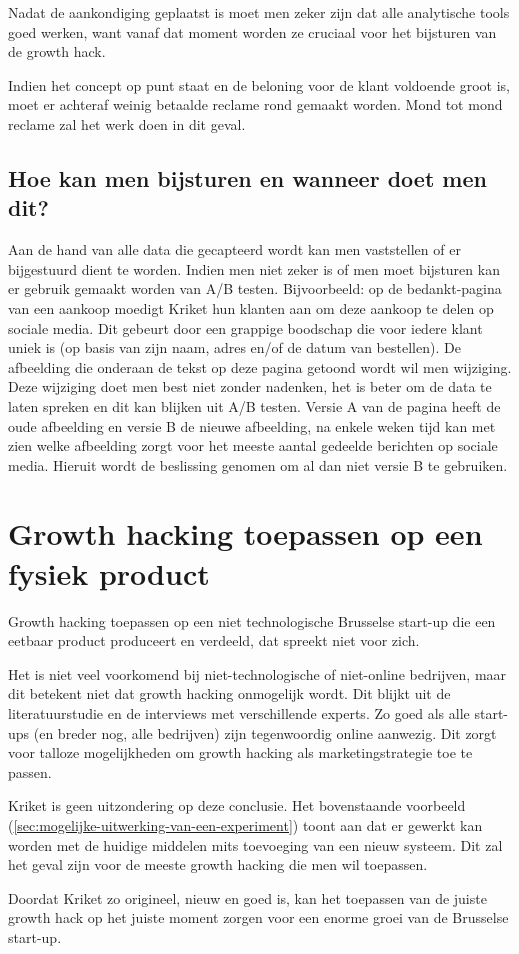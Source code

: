 Nadat de aankondiging geplaatst is moet men zeker zijn dat alle analytische tools goed werken, want vanaf dat moment worden ze cruciaal voor het bijsturen van de growth hack.

Indien het concept op punt staat en de beloning voor de klant voldoende groot is, moet er achteraf weinig betaalde reclame rond gemaakt worden. Mond tot mond reclame zal het werk doen in dit geval. 

\subsection{Hoe kan men bijsturen en wanneer doet men dit?}
\label{subsec:growth-hack-bijsturen}
Aan de hand van alle data die gecapteerd wordt kan men vaststellen of er bijgestuurd dient te worden. Indien men niet zeker is of men moet bijsturen kan er gebruik gemaakt worden van A/B testen. Bijvoorbeeld: op de bedankt-pagina van een aankoop moedigt Kriket hun klanten aan om deze aankoop te delen op sociale media. Dit gebeurt door een grappige boodschap die voor iedere klant uniek is (op basis van zijn naam, adres en/of de datum van bestellen). De afbeelding die onderaan de tekst op deze pagina getoond wordt wil men wijziging. Deze wijziging doet men best niet zonder nadenken, het is beter om de data te laten spreken en dit kan blijken uit A/B testen. Versie A van de pagina heeft de oude afbeelding en versie B de nieuwe afbeelding, na enkele weken tijd kan met zien welke afbeelding zorgt voor het meeste aantal gedeelde berichten op sociale media. Hieruit wordt de beslissing genomen om al dan niet versie B te gebruiken.
 
\section{Growth hacking toepassen op een fysiek product}
\label{sec:growth-hacking-mogelijk}
Growth hacking toepassen op een niet technologische Brusselse start-up die een eetbaar product produceert en verdeeld, dat spreekt niet voor zich. 

Het is niet veel voorkomend bij niet-technologische of niet-online bedrijven, maar dit betekent niet dat growth hacking onmogelijk wordt. Dit blijkt uit de literatuurstudie en de interviews met verschillende experts. Zo goed als alle start-ups (en breder nog, alle bedrijven) zijn tegenwoordig online aanwezig. Dit zorgt voor talloze mogelijkheden om growth hacking als marketingstrategie toe te passen. 

Kriket is geen uitzondering op deze conclusie. Het bovenstaande voorbeeld (\ref{sec:mogelijke-uitwerking-van-een-experiment}) toont aan dat er gewerkt kan worden met de huidige middelen mits toevoeging van een nieuw systeem. Dit zal het geval zijn voor de meeste growth hacking die men wil toepassen.

Doordat Kriket zo origineel, nieuw en goed is, kan het toepassen van de juiste growth hack op het juiste moment zorgen voor een enorme groei van de Brusselse start-up.  